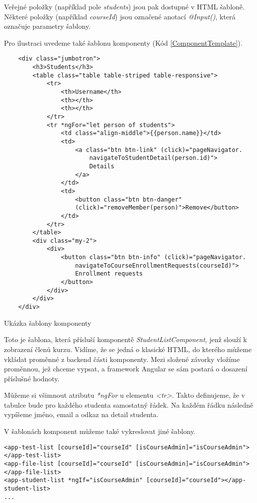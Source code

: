 Veřejné položky (například pole \textit{students}) jsou pak dostupné v HTML šabloně. Některé položky (například \textit{courseId}) jsou označené anotací \textit{@Input()}, která označuje parametry šablony.

Pro ilustraci uvedeme také šablonu komponenty (Kód \ref{ComponentTemplate}).

\lstset{style=html}

\begin{program}
	\begin{lstlisting}
	<div class="jumbotron">
		<h3>Students</h3>
		<table class="table table-striped table-responsive">
			<tr>
				<th>Username</th>
				<th></th>
				<th></th>
			</tr>
			<tr *ngFor="let person of students">
				<td class="align-middle">{{person.name}}</td>
				<td>
					<a class="btn btn-link" (click)="pageNavigator.
						navigateToStudentDetail(person.id)">
						Details
					</a>
				</td>
				<td>
					<button class="btn btn-danger" 
					(click)="removeMember(person)">Remove</button>
				</td>
			</tr>
		</table>
		<div class="my-2">
			<div>
				<button class="btn btn-info" (click)="pageNavigator.
					navigateToCourseEnrollmentRequests(courseId)">
					Enrollment requests
				</button>
			</div>
		</div>
	</div>
	\end{lstlisting}
	\caption{Ukázka šablony komponenty}
	\label{ComponentTemplate}
\end{program}

Toto je šablona, která přísluší komponentě \textit{StudentListComponent}, jenž slouží k zobrazení členů kurzu. Vidíme, že se jedná o klasické HTML, do kterého můžeme vkládat proměnné z backend části komponenty.
Mezi složené závorky vložíme proměnnou, jež chceme vypsat, a framework Angular se sám postará o dosazení příslušné hodnoty.

Můžeme si všimnout atributu \textit{*ngFor} u elementu \textit{<tr>}. Takto definujeme, že v tabulce bude pro každého studenta samostatný řádek.
Na každém řádku následně vypíšeme jméno, email a odkaz na detail studenta.

\vspace{\baselineskip}

V šablonách komponent můžeme také vykreslovat jiné šablony.

\begin{lstlisting}
<app-test-list [courseId]="courseId" [isCourseAdmin]="isCourseAdmin"></app-test-list>
<app-file-list [courseId]="courseId" [isCourseAdmin]="isCourseAdmin"></app-file-list>
<app-student-list *ngIf="isCourseAdmin" [courseId]="courseId"></app-student-list>
...
\end{lstlisting}

